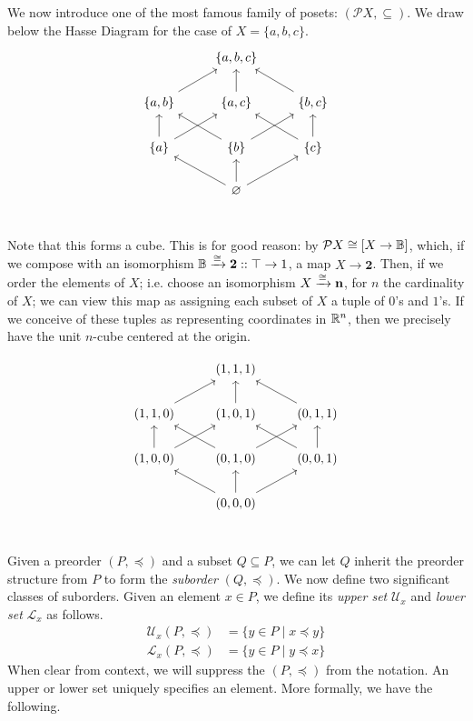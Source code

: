 We now introduce one of the most famous family of posets: $(\mathcal{P}X,\subseteq)$. We draw below the Hasse Diagram for the case of $X=\{a,b,c\}$.
\begin{equation}
\begin{tikzcd}
 & \{a,b,c\} & \\
 \{a,b\} \arrow[ur] & \{a,c\} \arrow[u] & \{b,c\} \arrow[ul] \\
 \{a\} \arrow[u] \arrow[ur] & \{b\} \arrow[ul] \arrow[ur] & \{c\} \arrow[u] \arrow[ul] \\
 & \varnothing \arrow[ul] \arrow[u] \arrow[ur] & \\
\end{tikzcd}
\end{equation}

Note that this forms a cube. This is for good reason: by $\mathcal{P}X\cong[X\to\mathbb B]$, which, if we compose with an isomorphism $\mathbb B\xrightarrow{\cong}\mathbf{2}::\top\to 1$, a map $X\to\mathbf{2}$. Then, if we order the elements of $X$; i.e. choose an isomorphism $X\xrightarrow{\cong}\mathbf{n}$, for $n$ the cardinality of $X$; we can view this map as assigning each subset of $X$ a tuple of $0$'s and $1$'s. If we conceive of these tuples as representing coordinates in $\mathbb R^n$, then we precisely have the unit $n$-cube centered at the origin. 

\begin{equation}
\begin{tikzcd}
 & (1,1,1) & \\
 (1,1,0) \arrow[ur] & (1,0,1) \arrow[u] & (0,1,1) \arrow[ul] \\
 (1,0,0) \arrow[u] \arrow[ur] & (0,1,0) \arrow[ul] \arrow[ur] & (0,0,1) \arrow[u] \arrow[ul] \\
 & (0,0,0) \arrow[ul] \arrow[u] \arrow[ur] & \\
\end{tikzcd}
\end{equation}

Given a preorder $(P,\preceq)$ and a subset $Q\subseteq P$, we can let $Q$ inherit the preorder structure from $P$ to form the \emph{suborder} $(Q,\preceq)$. We now define two significant classes of suborders. Given an element $x\in P$, we define its \emph{upper set} $\mathcal{U}_x$ and \emph{lower set} $\mathcal{L}_x$ as follows.
\begin{align*}
    \mathcal{U}_x(P,\preceq) &= \{y\in P\mid x\preceq y\}\\
    \mathcal{L}_x(P,\preceq) &= \{y\in P\mid y\preceq x\}
\end{align*}
When clear from context, we will suppress the $(P,\preceq)$ from the notation. An upper or lower set uniquely specifies an element. More formally, we have the following.

